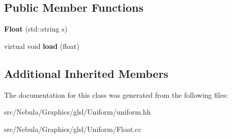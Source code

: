 \subsection*{Public Member Functions}
\begin{DoxyCompactItemize}
\item 
\hypertarget{classNeb_1_1glsl_1_1Uniform_1_1Scalar_1_1Float_a98cbc3f3264a8c007ae4bc942a0e552a}{{\bfseries Float} (std\-::string s)}\label{classNeb_1_1glsl_1_1Uniform_1_1Scalar_1_1Float_a98cbc3f3264a8c007ae4bc942a0e552a}

\item 
\hypertarget{classNeb_1_1glsl_1_1Uniform_1_1Scalar_1_1Float_a3e02efd7a02e8714a89dff10459dc47b}{virtual void {\bfseries load} (float)}\label{classNeb_1_1glsl_1_1Uniform_1_1Scalar_1_1Float_a3e02efd7a02e8714a89dff10459dc47b}

\end{DoxyCompactItemize}
\subsection*{Additional Inherited Members}


The documentation for this class was generated from the following files\-:\begin{DoxyCompactItemize}
\item 
src/\-Nebula/\-Graphics/glsl/\-Uniform/uniform.\-hh\item 
src/\-Nebula/\-Graphics/glsl/\-Uniform/Float.\-cc\end{DoxyCompactItemize}
